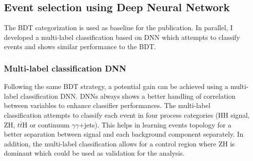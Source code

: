 \subsection{Event selection using Deep Neural Network}
\label{HHyybb:ObjEvt:DNN}

The BDT categorization is used as baseline for the publication. In parallel, I developed a multi-label classification based on DNN which attempts to classify events and shows similar performance to the BDT. 
\subsubsection{Multi-label classification DNN}
Following the same BDT strategy, a potential gain can be achieved using a multi-label classification DNN. DNNs always shows a better handling of correlation between variables to enhance classifier performances. The multi-label classification attempts to classify each event in four process categories (HH signal, ZH, $t\bar{t}$H or continuum $\gamma\gamma$+jets). This helps in learning events topology for a better separation between signal and each background component separately. In addition, the multi-label classification allows for a control region where ZH is dominant which could be used as validation for the \HHyybb analysis. \\

